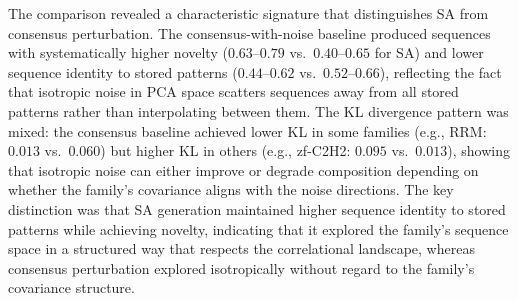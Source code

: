 The comparison revealed a characteristic signature that distinguishes SA from consensus perturbation. The consensus-with-noise baseline produced sequences with systematically higher novelty ($0.63$--$0.79$ vs.\ $0.40$--$0.65$ for SA) and lower sequence identity to stored patterns ($0.44$--$0.62$ vs.\ $0.52$--$0.66$), reflecting the fact that isotropic noise in PCA space scatters sequences away from all stored patterns rather than interpolating between them. The KL divergence pattern was mixed: the consensus baseline achieved lower KL in some families (e.g., RRM: $0.013$ vs.\ $0.060$) but higher KL in others (e.g., zf-C2H2: $0.095$ vs.\ $0.013$), showing that isotropic noise can either improve or degrade composition depending on whether the family's covariance aligns with the noise directions. The key distinction was that SA generation maintained higher sequence identity to stored patterns while achieving novelty, indicating that it explored the family's sequence space in a structured way that respects the correlational landscape, whereas consensus perturbation explored isotropically without regard to the family's covariance structure.

